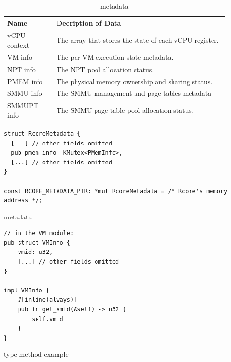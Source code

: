 \begin{table}
\begin{tabular}{ |p{0.2\linewidth}|p{0.7\linewidth}| }
\hline
\footnotesize \textbf{Name} & \footnotesize \textbf{Decription of Data} \\ \hline
\footnotesize vCPU context & \footnotesize The array that stores the state of each vCPU register. \\ \hline
\footnotesize VM info & \footnotesize The per-VM execution state metadata. \\ \hline
\footnotesize NPT info & \footnotesize The NPT pool allocation status. \\ \hline
\footnotesize PMEM info & \footnotesize The physical memory ownership and sharing status. \\ \hline
\footnotesize SMMU info & \footnotesize The SMMU management and page tables metadata. \\ \hline
\footnotesize SMMUPT info & \footnotesize The SMMU page table pool allocation status. \\ \hline
\end{tabular}
\vspace{0.2cm}
\caption{\rustcore{} metadata}
\label{tab:metadata}
\vspace{-0.4cm}
\end{table}

\begin{listing}[ht]
    \begin{verbatim}
struct RcoreMetadata {
  [...] // other fields omitted
  pub pmem_info: KMutex<PMemInfo>,
  [...] // other fields omitted
}

const RCORE_METADATA_PTR: *mut RcoreMetadata = /* Rcore's memory address */;

    \end{verbatim}
    \caption{\rustcore{} metadata}
    \label{lst:rcoremetadata}
    \vspace{-0.2cm}
\end{listing}

\begin{listing}[ht]
    \begin{verbatim}
// in the VM module:
pub struct VMInfo {
    vmid: u32,
    [...] // other fields omitted
}

impl VMInfo {
    #[inline(always)]
    pub fn get_vmid(&self) -> u32 {
        self.vmid
    }
}
    \end{verbatim}
    \caption{type method example}
    \label{lst:typemethod}
    \vspace{-0.2cm}
\end{listing}

